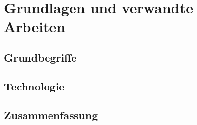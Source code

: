 \chapter{Grundlagen und verwandte Arbeiten}

\section{Grundbegriffe}

\section{Technologie}

\section{Zusammenfassung}
